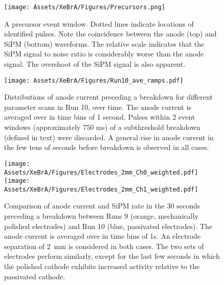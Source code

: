 \begin{figure} 
    \centering
    \texttt{[image: Assets/XeBrA/Figures/Precursors.png]}
    \caption[A precursor event window. Dotted lines indicate locations of identified pulses.]%
    {A precursor event window. Dotted lines indicate locations of identified pulses.
    Note the coincidence between the anode (top) and SiPM (bottom) waveforms.
    The relative scale indicates that the SiPM signal to noise ratio is considerably worse than the anode signal.
    The overshoot of the SiPM signal is also apparent.}
    \label{fig:precursors}
\end{figure}
\begin{figure}
    \centering
    \texttt{[image: Assets/XeBrA/Figures/Run10\_ave\_ramps.pdf]}
    \caption[ Distributions of anode current preceding a breakdown for different parameter scans in Run 10, over time.]%
    {
    Distributions of anode current preceding a breakdown for different parameter scans in Run 10, over time. The anode current is averaged over in time bins of 1 second. Pulses within 2 event windows (approximately 750 ms) of a subthreshold breakdown (defined in text) were discarded. A general rise in anode current in the few tens of seconds before breakdown is observed in all cases.
    }
    \label{fig:Run9_chargetime}
\end{figure}
\begin{figure}
    \centering
    \texttt{[image: Assets/XeBrA/Figures/Electrodes\_2mm\_Ch0\_weighted.pdf]} \qquad
    \texttt{[image: Assets/XeBrA/Figures/Electrodes\_2mm\_Ch1\_weighted.pdf]}
    \caption[Comparison of anode current and SiPM rate in the 30 seconds preceding a breakdown between Runs 9 (orange, mechanically polished electrodes) and Run 10 (blue, passivated electrodes).]%
    {Comparison of anode current and SiPM rate in the 30 seconds preceding a breakdown between Runs 9 (orange, mechanically polished electrodes) and Run 10 (blue, passivated electrodes). The anode current is averaged over in time bins of 1s. An electrode separation of 2~mm is considered in both cases.
    The two sets of electrodes perform similarly, except for the last few seconds in which the polished cathode exhibits increased activity relative to the passivated cathode. 
    }
    \label{fig:ElectrodeComparison}
\end{figure}

